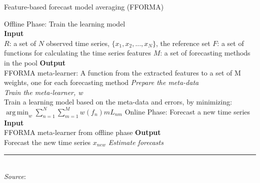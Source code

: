 \documentclass[12pt]{article}
\DeclareMathOperator*{\argmin}{arg\,min} %
\begin{document}
\begin{algorithm}[H]
\SetAlgoLined
\label{alg:fforma}
 \caption{Feature-based forecast model averaging (FFORMA)} %
 Offline Phase: Train the learning model\\
 \textbf{Input}\\ 
 \hspace{10pt} $R$: a set of $N$ observed time series, $\{x_1, x_2,...,x_N\}$, the reference set\;
 \hspace{10pt} $F$: a set of functions for calculating the time series features\;
 \hspace{10pt} $M$: a set of forecasting methods in the pool\;
 \textbf{Output} \\
 \hspace{10pt} FFORMA meta-learner: A function from the extracted features to a set of M weights, one for each forecasting method \;
 \vspace{10pt}
 \textit{Prepare the meta-data}\\
 \vspace{10pt}
 \textit{Train the meta-learner, w}\\
 Train a learning model based on the meta-data and errors, by minimizing:
 $\argmin_w \sum^{N}_{n=1}\sum^{M}_{m=1} w(f_n)mL_{nm}$ \;
 \vspace{10pt}
 Online Phase: Forecast a new time series\\
 \textbf{Input}\\ 
 \hspace{10pt} FFORMA meta-learner from offline phase\;
 \textbf{Output} \\
 \hspace{10pt} Forecast the new time series $x_{new}$\;
 \vspace{10pt}
 \textit{Estimate forecasts}\\
 \vspace{2pt}
 \hrule\\
 \vspace{2pt}
 \textit{Source}: \cite{MMAHT2018}
\end{algorithm} 
\end{document}
